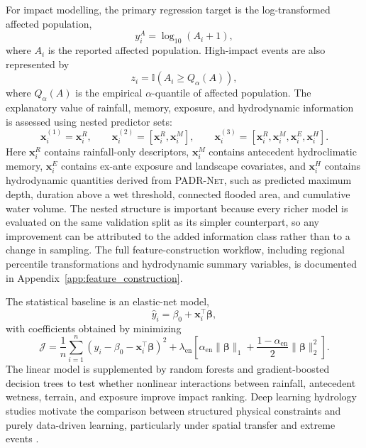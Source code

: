 \documentclass[pdflatex,sn-mathphys-ay]{sn-jnl}
\theoremstyle{thmstyleone}
\theoremstyle{thmstylethree}
\theoremstyle{thmstyletwo}
\begin{document}
For impact modelling, the primary regression target is the
log-transformed affected population,
\begin{equation}
  y^{A}_{i}
  =
  \log_{10}(A_i+1),
  \label{eq:impact_target}
\end{equation}
where $A_i$ is the reported affected population.  High-impact events
are also represented by
\begin{equation}
  z_i
  =
  \mathbb{I}
  \left(
    A_i\geq Q_{\alpha}(A)
  \right),
  \label{eq:impact_indicator}
\end{equation}
where $Q_{\alpha}(A)$ is the empirical $\alpha$-quantile of affected
population.  The explanatory value of rainfall, memory, exposure, and
hydrodynamic information is assessed using nested predictor sets:
\begin{equation}
  \mathbf{x}^{(1)}_{i}
  =
  \mathbf{x}^{R}_{i},
  \qquad
  \mathbf{x}^{(2)}_{i}
  =
  [
    \mathbf{x}^{R}_{i},
    \mathbf{x}^{M}_{i}
  ],
  \qquad
  \mathbf{x}^{(3)}_{i}
  =
  [
    \mathbf{x}^{R}_{i},
    \mathbf{x}^{M}_{i},
    \mathbf{x}^{E}_{i},
    \mathbf{x}^{H}_{i}
  ].
  \label{eq:nested_features}
\end{equation}
Here $\mathbf{x}^{R}_{i}$ contains rainfall-only descriptors,
$\mathbf{x}^{M}_{i}$ contains antecedent hydroclimatic memory,
$\mathbf{x}^{E}_{i}$ contains ex-ante exposure and landscape
covariates, and $\mathbf{x}^{H}_{i}$ contains hydrodynamic quantities
derived from \textsc{PADR-Net}, such as predicted maximum depth,
duration above a wet threshold, connected flooded area, and cumulative
water volume.  The nested structure is important because every richer
model is evaluated on the same validation split as its simpler
counterpart, so any improvement can be attributed to the added
information class rather than to a change in sampling.  The full
feature-construction workflow, including regional percentile
transformations and hydrodynamic summary variables, is documented in
Appendix~\ref{app:feature_construction}.

The statistical baseline is an elastic-net model,
\begin{equation}
  \hat{y}_{i}
  =
  \beta_{0}
  +
  \mathbf{x}_{i}^{\top}\boldsymbol{\beta},
  \label{eq:elastic_prediction}
\end{equation}
with coefficients obtained by minimizing
\begin{equation}
  \mathcal{J}
  =
  \frac{1}{n}
  \sum_{i=1}^{n}
  \left(
    y_i
    -
    \beta_{0}
    -
    \mathbf{x}_{i}^{\top}\boldsymbol{\beta}
  \right)^2
  +
  \lambda_{\mathrm{en}}
  \left[
    \alpha_{\mathrm{en}}
    \|\boldsymbol{\beta}\|_{1}
    +
    \frac{1-\alpha_{\mathrm{en}}}{2}
    \|\boldsymbol{\beta}\|_{2}^{2}
  \right].
  \label{eq:elastic_loss}
\end{equation}
The linear model is supplemented by random forests and gradient-boosted
decision trees to test whether nonlinear interactions between rainfall,
antecedent wetness, terrain, and exposure improve impact ranking.  Deep
learning hydrology studies motivate the comparison between structured
physical constraints and purely data-driven learning, particularly under
spatial transfer and extreme events \citep{Kratzert2019,Nearing2024}.
\end{document}
